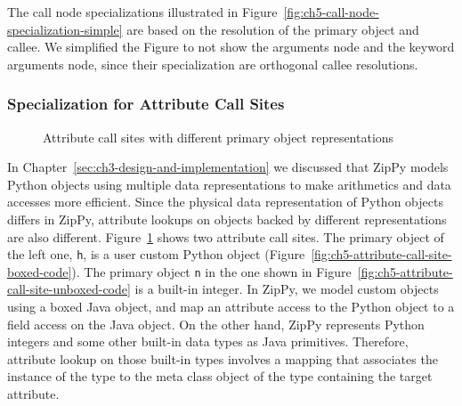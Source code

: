 The call node specializations illustrated in Figure~\ref{fig:ch5-call-node-specialization-simple} are based on the resolution of the primary object and callee.
We simplified the Figure to not show the arguments node and the keyword arguments node, since their specialization are orthogonal callee resolutions.

\subsubsection{Specialization for Attribute Call Sites}

\begin{figure}
\centering
{}
\caption{Attribute call sites with different primary object representations}
\label{fig:ch5-attribute-call-site-boxed-unboxed-code}
\end{figure}

In Chapter~\ref{sec:ch3-design-and-implementation} we discussed that ZipPy models Python objects using multiple data representations to make arithmetics and data accesses more efficient.
Since the physical data representation of Python objects differs in ZipPy, attribute lookups on objects backed by different representations are also different.
Figure~\ref{fig:ch5-attribute-call-site-boxed-unboxed-code} shows two attribute call sites.
The primary object of the left one, \texttt{h}, is a user custom Python object (Figure~\ref{fig:ch5-attribute-call-site-boxed-code}).
The primary object \texttt{n} in the one shown in Figure~\ref{fig:ch5-attribute-call-site-unboxed-code} is a built-in integer.
In ZipPy, we model custom objects using a boxed Java object, and map an attribute access to the Python object to a field access on the Java object.
On the other hand, ZipPy represents Python integers and some other built-in data types as Java primitives.
Therefore, attribute lookup on those built-in types involves a mapping that associates the instance of the type to the meta class object of the type containing the target attribute.


